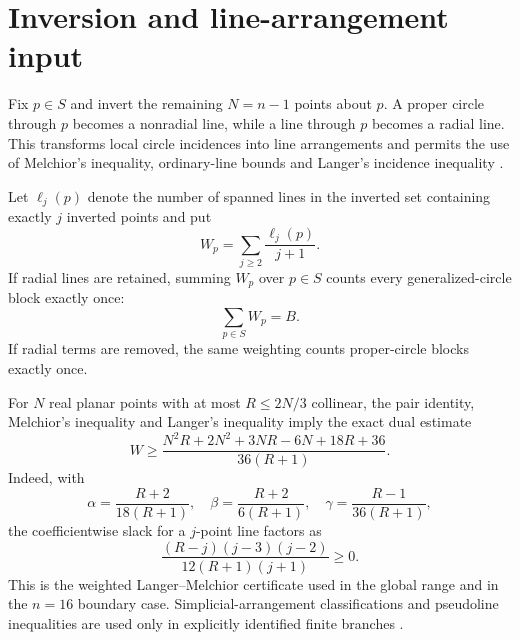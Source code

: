 \section{Inversion and line-arrangement input}

Fix $p\in S$ and invert the remaining $N=n-1$ points about $p$.  A proper circle through $p$ becomes a nonradial line, while a line through $p$ becomes a radial line.  This transforms local circle incidences into line arrangements and permits the use of Melchior's inequality, ordinary-line bounds and Langer's incidence inequality \cite{kellymoser1958,csimasawyer1993,langer2003,dezeeuw2018}.

Let $\ell_j(p)$ denote the number of spanned lines in the inverted set containing exactly $j$ inverted points and put
\[
 W_p=\sum_{j\ge2}\frac{\ell_j(p)}{j+1}.
\]
If radial lines are retained, summing $W_p$ over $p\in S$ counts every generalized-circle block exactly once:
\begin{equation}\label{eq:weightedall}
 \sum_{p\in S}W_p=B.
\end{equation}
If radial terms are removed, the same weighting counts proper-circle blocks exactly once.

For $N$ real planar points with at most $R\le2N/3$ collinear, the pair identity, Melchior's inequality and Langer's inequality imply the exact dual estimate
\begin{equation}\label{eq:weightedLM}
 W\ge
 \frac{N^2R+2N^2+3NR-6N+18R+36}{36(R+1)}.
\end{equation}
Indeed, with
\[
 \alpha=\frac{R+2}{18(R+1)},\quad
 \beta=\frac{R+2}{6(R+1)},\quad
 \gamma=\frac{R-1}{36(R+1)},
\]
the coefficientwise slack for a $j$-point line factors as
\[
 \frac{(R-j)(j-3)(j-2)}{12(R+1)(j+1)}\ge0.
\]
This is the weighted Langer--Melchior certificate used in the global range and in the $n=16$ boundary case.  Simplicial-arrangement classifications and pseudoline inequalities are used only in explicitly identified finite branches \cite{cuntz2012,shnurnikov2016}.

